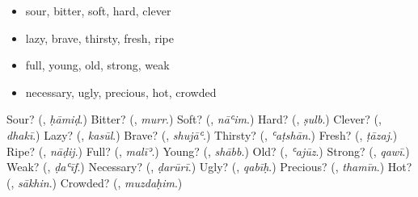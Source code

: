 \begin{itemize}
\raggedright
  \item sour, bitter, soft, hard, clever
  \item lazy, brave, thirsty, fresh, ripe
  \item full, young, old, strong, weak
  \item necessary, ugly, precious, hot, crowded
\end{itemize}

\begin{tcolorbox}[breakable,colback=teal!4,colframe=teal!35!black,title={Before you move on}]
Sour? (\textbf{}, \emph{ḥāmiḍ}.) Bitter? (\textbf{}, \emph{murr}.) Soft? (\textbf{}, \emph{nāʿim}.) Hard? (\textbf{}, \emph{ṣulb}.) Clever? (\textbf{}, \emph{dhakī}.) Lazy? (\textbf{}, \emph{kasūl}.) Brave? (\textbf{}, \emph{shujāʿ}.) Thirsty? (\textbf{}, \emph{ʿaṭshān}.) Fresh? (\textbf{}, \emph{ṭāzaj}.) Ripe? (\textbf{}, \emph{nāḍij}.) Full? (\textbf{}, \emph{malīʾ}.) Young? (\textbf{}, \emph{shābb}.) Old? (\textbf{}, \emph{ʿajūz}.) Strong? (\textbf{}, \emph{qawī}.) Weak? (\textbf{}, \emph{ḍaʿīf}.) Necessary? (\textbf{}, \emph{ḍarūrī}.) Ugly? (\textbf{}, \emph{qabīḥ}.) Precious? (\textbf{}, \emph{thamīn}.) Hot? (\textbf{}, \emph{sākhin}.) Crowded? (\textbf{}, \emph{muzdaḥim}.)
\end{tcolorbox}
